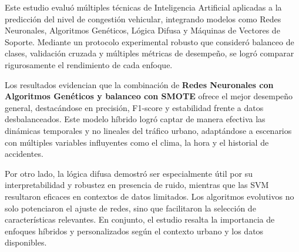 \documentclass{svproc} %
\begin{document}
Este estudio evaluó múltiples técnicas de Inteligencia Artificial aplicadas a la predicción del nivel de congestión vehicular, integrando modelos como Redes Neuronales, Algoritmos Genéticos, Lógica Difusa y Máquinas de Vectores de Soporte. Mediante un protocolo experimental robusto que consideró balanceo de clases, validación cruzada y múltiples métricas de desempeño, se logró comparar rigurosamente el rendimiento de cada enfoque.

Los resultados evidencian que la combinación de \textbf{Redes Neuronales con Algoritmos Genéticos y balanceo con SMOTE} ofrece el mejor desempeño general, destacándose en precisión, F1-score y estabilidad frente a datos desbalanceados. Este modelo híbrido logró captar de manera efectiva las dinámicas temporales y no lineales del tráfico urbano, adaptándose a escenarios con múltiples variables influyentes como el clima, la hora y el historial de accidentes.

Por otro lado, la lógica difusa demostró ser especialmente útil por su interpretabilidad y robustez en presencia de ruido, mientras que las SVM resultaron eficaces en contextos de datos limitados. Los algoritmos evolutivos no solo potenciaron el ajuste de redes, sino que facilitaron la selección de características relevantes. En conjunto, el estudio resalta la importancia de enfoques híbridos y personalizados según el contexto urbano y los datos disponibles.
\end{document}

